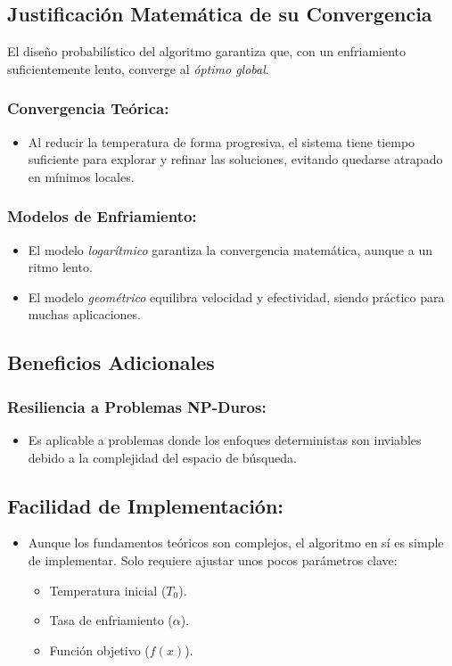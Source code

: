 \documentclass{article}
\begin{document}
\subsection{Justificación Matemática de su Convergencia}

El diseño probabilístico del algoritmo garantiza que, con un enfriamiento suficientemente lento, converge al \textit{óptimo global}.

\subsubsection{Convergencia Teórica:}
\begin{itemize}
    \item Al reducir la temperatura de forma progresiva, el sistema tiene tiempo suficiente para explorar y refinar las soluciones, evitando quedarse atrapado en mínimos locales.
\end{itemize}

\subsubsection{Modelos de Enfriamiento:}
\begin{itemize}
    \item El modelo \textit{logarítmico} garantiza la convergencia matemática, aunque a un ritmo lento.
    \item El modelo \textit{geométrico} equilibra velocidad y efectividad, siendo práctico para muchas aplicaciones.
\end{itemize}

\subsection{Beneficios Adicionales}

\subsubsection{Resiliencia a Problemas NP-Duros:}
\begin{itemize}
    \item Es aplicable a problemas donde los enfoques deterministas son inviables debido a la complejidad del espacio de búsqueda.
\end{itemize}

\subsection{Facilidad de Implementación:}
\begin{itemize}
    \item Aunque los fundamentos teóricos son complejos, el algoritmo en sí es simple de implementar. Solo requiere ajustar unos pocos parámetros clave:
    \begin{itemize}
        \item Temperatura inicial ($T_0$).
        \item Tasa de enfriamiento ($\alpha$).
        \item Función objetivo ($f(x)$).
    \end{itemize}
\end{itemize}
\end{document}
